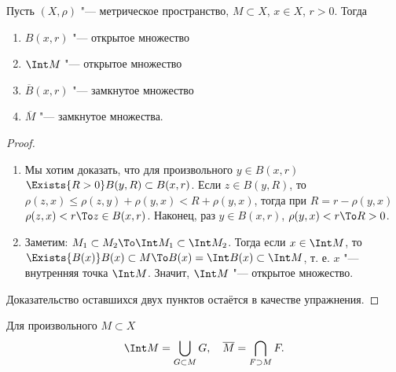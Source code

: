 \documentclass[main]{subfiles}
\begin{document}
\begin{theorem}
  Пусть \( (X, \rho) \) "--- метрическое пространство,
  \( M \subset X \), \( x \in X \), \( r > 0 \).
  Тогда
  \begin{enumerate}
    \item \( B(x, r) \) "--- открытое множество
    \item \( \Int M \) "--- открытое множество
    \item \( \overline{B}(x, r) \) "--- замкнутое множество
    \item  \( \overline{M} \) "--- замкнутое множества.
  \end{enumerate}
\end{theorem}
\begin{proof}~
  \begin{enumerate}
    \item Мы хотим доказать, что для произвольного \( y \in B(x, r) \)
      \( \Exists{R > 0} B(y, R) \subset B(x, r) \).
      Если \( z \in B(y, R) \), то
      \( \rho(z, x) \le \rho(z, y) + \rho(y, x) < R + \rho(y, x) \),
      тогда при \( R = r - \rho(y, x) \) \( \rho(z, x) < r \To z \in B(x, r) \).
      Наконец, раз \( y \in B(x, r) \), \( \rho(y, x) < r \To R > 0 \).

    \item Заметим: \( M_1 \subset M_2 \To \Int M_1 \subset \Int M_2 \).
      Тогда если \( x \in \Int M \), то
      \( \Exists{B(x)} B(x) \subset M \To
      B(x) = \Int B(x) \subset \Int M \), т. е.
      \( x \) "--- внутренняя точка \( \Int M \).
      Значит, \( \Int M \) "--- открытое множество.
  \end{enumerate}
  Доказательство оставшихся двух пунктов остаётся в качестве упражнения.
\end{proof}

\begin{remark}
  Для произвольного \( M \subset X \)
  \[
    \Int M = \bigcup_{G \subset M} G,
    \quad
    \overline{M} = \bigcap_{F \supset M} F.
  \]
\end{remark}
\end{document}
